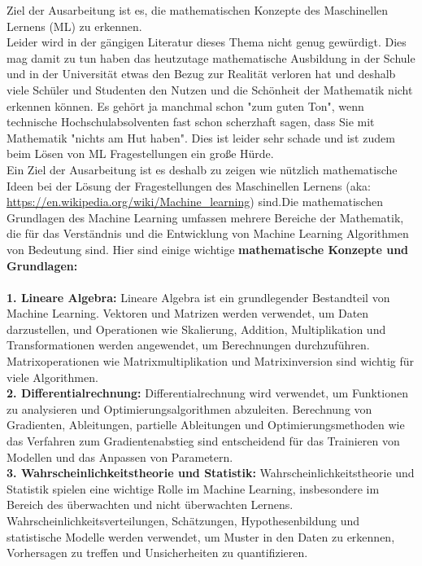 \documentclass[12pt]{article}
\begin{document}
Ziel der Ausarbeitung ist es, die {\color{blue}mathematischen Konzepte des Maschinellen Lernens (ML)} zu erkennen.\\
Leider wird in der gängigen Literatur dieses Thema nicht genug gewürdigt. Dies mag damit zu tun haben das heutzutage mathematische Ausbildung in der Schule und in der Universität etwas den Bezug zur Realität verloren hat und deshalb viele Schüler und Studenten den Nutzen und die Schönheit der Mathematik nicht erkennen können. Es gehört ja manchmal schon "zum guten Ton", wenn technische Hochschulabsolventen fast schon scherzhaft sagen, dass Sie mit Mathematik "nichts am Hut haben". Dies ist leider sehr schade und ist zudem beim Lösen von ML Fragestellungen ein große Hürde.\\ Ein Ziel der Ausarbeitung ist es deshalb zu zeigen wie nützlich mathematische Ideen bei der Lösung der Fragestellungen des Maschinellen Lernens (aka: \url{https://en.wikipedia.org/wiki/Machine_learning}) sind.Die mathematischen Grundlagen des Machine Learning umfassen mehrere Bereiche der Mathematik, die für das Verständnis und die Entwicklung von Machine Learning Algorithmen von Bedeutung sind.
Hier sind einige wichtige \textbf{mathematische Konzepte und Grundlagen:}\\
\\
\textbf{1. Lineare Algebra:} Lineare Algebra ist ein grundlegender Bestandteil von Machine Learning. Vektoren und Matrizen werden verwendet, um Daten darzustellen, und Operationen wie Skalierung, Addition, Multiplikation und Transformationen werden angewendet, um Berechnungen durchzuführen. Matrixoperationen wie Matrixmultiplikation und Matrixinversion sind wichtig für viele Algorithmen.\\[0.2cm]
%
\textbf{2. Differentialrechnung:} Differentialrechnung wird verwendet, um Funktionen zu analysieren und Optimierungsalgorithmen abzuleiten. Berechnung von Gradienten, Ableitungen, partielle Ableitungen und Optimierungsmethoden wie das Verfahren zum Gradientenabstieg sind entscheidend für das Trainieren von Modellen und das Anpassen von Parametern.\\[0.2cm]
%
\textbf{3. Wahrscheinlichkeitstheorie und Statistik:} Wahrscheinlichkeitstheorie und Statistik spielen eine wichtige Rolle im Machine Learning, insbesondere im Bereich des überwachten und nicht überwachten Lernens. Wahrscheinlichkeitsverteilungen, Schätzungen, Hypothesenbildung und statistische Modelle werden verwendet, um Muster in den Daten zu erkennen, Vorhersagen zu treffen und Unsicherheiten zu quantifizieren.\\[0.2cm]
\end{document}
